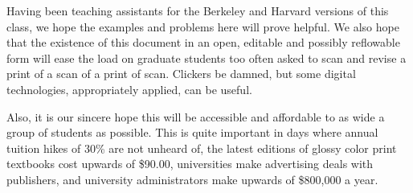 Having been teaching assistants for the Berkeley and Harvard versions of this class, we hope the examples and problems here will prove helpful.  We also hope that the existence of this document in an open, editable and possibly reflowable form will ease the load on graduate students too often asked to scan and revise a print of a scan of a print of scan.  Clickers be damned, but some digital technologies, appropriately applied, can be useful.

Also, it is our sincere hope this will be accessible and affordable to as wide a group of students as possible.  This is quite important in days where annual tuition hikes of 30\% are not unheard of, the latest editions of glossy color print textbooks cost upwards of \$90.00, universities make advertising deals with publishers\cite{Asimov:2012}, and university administrators make upwards of \$800,000 a year. 

